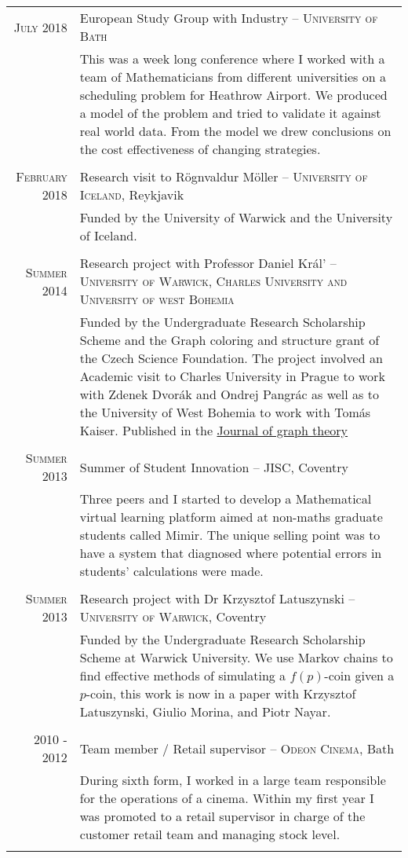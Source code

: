 \documentclass[a4paper,10pt]{article}
\begin{document}
\begin{tabular}{r|p{14.2 cm}}
\textsc{July 2018} & European Study Group with Industry -- \textsc{University of Bath}\\&\footnotesize{This was a week long conference where I worked with a team of Mathematicians from different universities on a scheduling problem for Heathrow Airport. We produced a model of the problem and tried to validate it against real world data. From the model we drew conclusions on the cost effectiveness of changing strategies.}\\\multicolumn{2}{c}{} \\	
\textsc{February 2018} & Research visit to R\"{o}gnvaldur M\"{o}ller -- \textsc{University of Iceland}, Reykjavik\\&\footnotesize{Funded by the University of Warwick and the University of Iceland.}\\\multicolumn{2}{c}{} \\
\textsc{Summer 2014} & Research project with Professor Daniel Kr\'{a}l' -- \textsc{University of Warwick, Charles University and University of west Bohemia}\\&\footnotesize{Funded by the Undergraduate Research Scholarship Scheme and the Graph coloring and structure grant of the Czech Science Foundation. The project involved an Academic visit to Charles University in Prague to work with Zdenek Dvorák and Ondrej Pangrác as well as to the University of West Bohemia to work with Tomás Kaiser. Published in the \href{http://onlinelibrary.wiley.com/doi/10.1002/jgt.22002/abstract}{Journal of graph theory}}\\\multicolumn{2}{c}{} \\
\textsc{Summer 2013} & Summer of Student Innovation -- \textsc{JISC}, Coventry\\&\footnotesize{Three peers and I started to develop a Mathematical virtual learning platform aimed at non-maths graduate students called Mimir. The unique selling point was to have a system that diagnosed where potential errors in students' calculations were made.}\\\multicolumn{2}{c}{} \\
\textsc{Summer 2013} & Research project with Dr Krzysztof Latuszynski -- \textsc{University of Warwick}, Coventry\\&\footnotesize{Funded by the Undergraduate Research Scholarship Scheme at Warwick University. We use Markov chains to find effective methods of simulating a $f(p)$-coin given a $p$-coin, this work is now in a paper with Krzysztof Latuszynski, Giulio Morina, and Piotr Nayar.}\\\multicolumn{2}{c}{} \\
\textsc{2010 - 2012} & Team member / Retail supervisor -- \textsc{Odeon Cinema}, Bath\\&\footnotesize{During sixth form, I worked in a large team responsible for the operations of a cinema. Within my first year I was promoted to a retail supervisor in charge of the customer retail team and managing stock level.}\\\multicolumn{2}{c}{} \\
\end{tabular}
\end{document}
